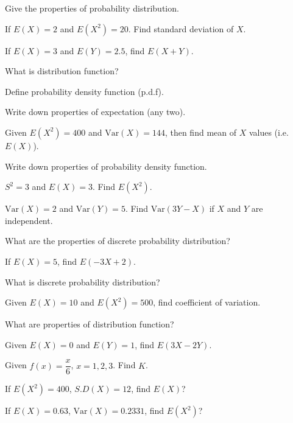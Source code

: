 \documentclass[11pt,a4paper]{article}
\begin{document}
\begin{shortlist}
\item Give the properties of probability distribution.

\item If $E(X)=2$ and $E(X^2)=20$. Find standard deviation of $X$.

\item If $E(X)=3$ and $E(Y)=2.5$, find $E(X+Y)$.

\item What is distribution function?

\item Define probability density function (p.d.f).

\item Write down properties of expectation (any two).

\item Given $E(X^2)=400$ and $\mathrm{Var}(X)=144$, then find mean of $X$ values (i.e. $E(X)$).

\item Write down properties of probability density function.

\item $S^2=3$ and $E(X)=3$. Find $E(X^2)$.

\item $\mathrm{Var}(X)=2$ and $\mathrm{Var}(Y)=5$. Find $\mathrm{Var}(3Y-X)$ if $X$ and $Y$ are independent.

\item What are the properties of discrete probability distribution?

\item If $E(X)=5$, find $E(-3X+2)$.

\item What is discrete probability distribution?

\item Given $E(X)=10$ and $E(X^2)=500$, find coefficient of variation.

\item What are properties of distribution function?

\item Given $E(X)=0$ and $E(Y)=1$, find $E(3X-2Y)$.

\item Given $f(x)=\dfrac{x}{6}$, $x=1,2,3$. Find $K$.

\item If $E(X^2)=400$, $S.D(X)=12$, find $E(X)$?

\item If $E(X)=0.63$, $\mathrm{Var}(X)=0.2331$, find $E(X^2)$?


\end{shortlist}
\end{document}
